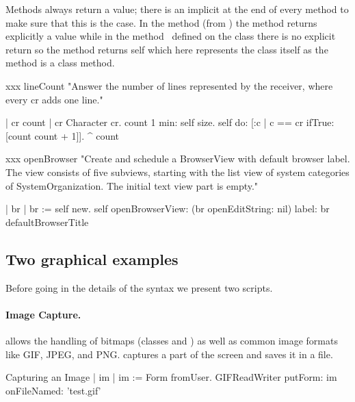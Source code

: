 \documentclass[a4paper,10pt,twoside]{book}
\begin{document}
Methods always return a value; there is an implicit  at the end of every method to make sure that this is the case. In the method  (from ) the method returns explicitly a value while in the method~ defined on the class  there is no
explicit return so the method returns self which here represents the class itself as the method is a class method. 

\begin{method}[xxx]{xxx}
lineCount
   "Answer the number of lines represented by the receiver, where every
   cr adds one line."
    
   | cr count |
   cr  Character cr.
   count  1  min: self size.
   self do:
      [:c | c == cr ifTrue: [count  count + 1]].
   ^ count
\end{method}

\begin{method}[xxx]{xxx}
openBrowser
   "Create and schedule a BrowserView with default browser label. The
   view consists of five subviews, starting with the list view of system
   categories of SystemOrganization. The initial text view part is empty."

   | br |
   br := self new.
   self
      openBrowserView: (br openEditString: nil)
      label: br defaultBrowserTitle
\end{method}


\subsection{Two graphical examples}


Before going in the details of the syntax we present two scripts. 

\paragraph{Image Capture.}
\sq allows the handling of bitmaps (classes  and ) as well as common image formats like GIF, JPEG, and PNG.  captures a part of the screen and saves it in a file.

\begin{script}{Capturing an Image}
| im |
im := Form fromUser.
GIFReadWriter putForm: im onFileNamed: 'test.gif'
\end{script}
\end{document}
